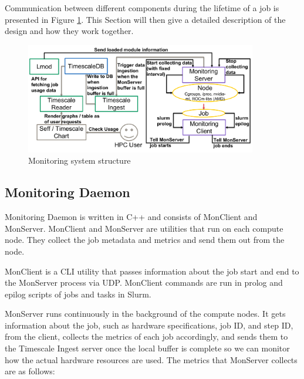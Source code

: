 
Communication between different components during the lifetime of a job is presented in Figure \ref{fig_monitoring}. This Section will then give a detailed description of the design and how they work together.

\begin{figure}[H]
    \centering
    \includegraphics[width=0.9\textwidth]{figures/monitoring.pdf}
    \caption{Monitoring system structure}
    \label{fig_monitoring}
\end{figure}

\subsection{Monitoring Daemon}

Monitoring Daemon is written in C++ and consists of MonClient and MonServer. MonClient and MonServer are utilities that run on each compute node. They collect the job metadata and metrics and send them out from the node.

MonClient is a CLI utility that passes information about the job start and end to the MonServer process via UDP. MonClient commands are run in prolog and epilog scripts of jobs and tasks in Slurm.

MonServer runs continuously in the background of the compute nodes. It gets information about the job, such as hardware specifications, job ID, and step ID, from the client, collects the metrics of each job accordingly, and sends them to the Timescale Ingest server once the local buffer is complete so we can monitor how the actual hardware resources are used. The metrics that MonServer collects are as follows:

